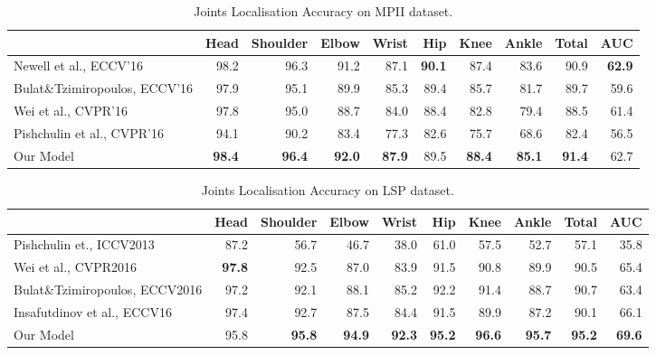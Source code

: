\begin{table}[t!]
\small
\begin{center}
\begin{tabular}{|l|r|r|r|r|r|r|r|r|r|}
\hline
 &\textbf{Head}   & \textbf{Shoulder} & \textbf{Elbow} & \textbf{Wrist} & \textbf{Hip}   & \textbf{Knee} & \textbf{Ankle} & \textbf{Total} & \textbf{AUC} \\
\hline\hline
Newell et al., ECCV'16 \cite{newell2016stacked}       & 98.2  & 96.3  & 91.2  & 87.1  & \textbf{90.1}  & 87.4 & 83.6 & 90.9 & \textbf{62.9} \\
Bulat\&Tzimiropoulos, ECCV'16 \cite{bulat2016human} & 97.9  & 95.1  & 89.9  & 85.3  & 89.4  & 85.7 & 81.7 & 89.7 & 59.6 \\
Wei et al., CVPR'16 \cite{wei2016convolutional}          & 97.8  & 95.0  & 88.7  & 84.0  & 88.4  & 82.8 & 79.4 & 88.5 & 61.4 \\
Pishchulin et al., CVPR'16 \cite{pishchulin16cvpr}   & 94.1  & 90.2  & 83.4  & 77.3  & 82.6  & 75.7 & 68.6 & 82.4 & 56.5 \\
\hline
Our Model                     & \textbf{98.4}  & \textbf{96.4}  & \textbf{92.0}  & \textbf{87.9}  & 89.5  & \textbf{88.4} & \textbf{85.1} & \textbf{91.4} & 62.7 \\
\hline
\end{tabular}
\end{center}
\caption{Joints Localisation Accuracy on MPII dataset.}
\label{tab:mpii}
\end{table}
\begin{table}[t!]
\small
\begin{center}
\begin{tabular}{|l|r|r|r|r|r|r|r|r|r|}
\hline
 &\textbf{Head}   & \textbf{Shoulder} & \textbf{Elbow} & \textbf{Wrist} & \textbf{Hip}   & \textbf{Knee} & \textbf{Ankle} & \textbf{Total} & \textbf{AUC} \\
\hline\hline
Pishchulin et., ICCV2013 \cite{pishchulin2013poselet} & 87.2  & 56.7  & 46.7  & 38.0  & 61.0  & 57.5 & 52.7 & 57.1 & 35.8\\
Wei et al., CVPR2016 \cite{wei2016convolutional} & \textbf{97.8}  & 92.5  & 87.0  & 83.9  & 91.5  & 90.8 & 89.9 & 90.5 & 65.4\\
Bulat\&Tzimiropoulos, ECCV2016 \cite{bulat2016human}& 97.2  & 92.1  & 88.1  & 85.2  & 92.2  & 91.4 & 88.7 & 90.7 & 63.4\\
Insafutdinov et al., ECCV16 \cite{insafutdinov16ariv}& 97.4  & 92.7  & 87.5  & 84.4  & 91.5  & 89.9 & 87.2 & 90.1 & 66.1\\
\hline
Our Model& 95.8  & \textbf{95.8}  & \textbf{94.9}  & \textbf{92.3}  & \textbf{95.2}  & \textbf{96.6} & \textbf{95.7} & \textbf{95.2} & \textbf{69.6}\\
\hline
\end{tabular}
\end{center}
\caption{Joints Localisation Accuracy on LSP dataset.}
\label{tab:lsp}
\end{table}


